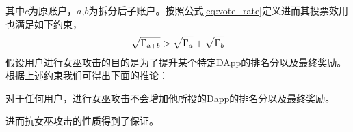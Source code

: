 其中$c$为原账户，$a$,$b$为拆分后子账户。按照公式\ref{eq:vote_rate}定义进而其投票效用也满足如下约束，
\begin{align}
\label{eq:sqrt_nr}
\sqrt{\Gamma_{a+b}}>\sqrt{\Gamma_a}+\sqrt{\Gamma_b}
\end{align}
假设用户进行女巫攻击的目的是为了提升某个特定DApp的排名分以及最终奖励。根据上述约束我们可得出下面的推论：
\begin{property}
	\label{p3}
	对于任何用户，进行女巫攻击不会增加他所投的Dapp的排名分以及最终奖励。
\end{property}
进而抗女巫攻击的性质得到了保证。

	
	
